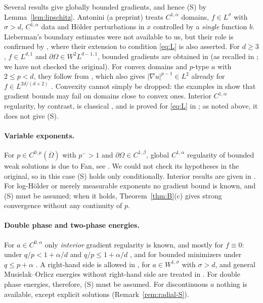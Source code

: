 \documentclass[11pt]{amsart}
\theoremstyle{definition}
\theoremstyle{remark}
\numberwithin{equation}{section}
\newcommand{\abs}[1]{\lvert #1\rvert}
\begin{document}
Several results give globally bounded gradients, and hence (S) by Lemma~\ref{lem:lipschitz}. Antonini \cite[Cor.~1.4]{Antonini2026} (a preprint) treats $C^{1,\alpha}$ domains, $f\in L^\sigma$ with $\sigma>d$, $C^{1,\alpha}$ data and H\"older perturbations in $x$ controlled by a \emph{single} function $b$. Lieberman's boundary estimates \cite[Thms.~1--2]{Lieberman1988} were not available to us, but their role is confirmed by \cite[p.~320]{Lieberman1991}, where their extension to condition \eqref{eq:L} is also asserted. %
For $d\ge3$, $f\in L^{d,1}$ and $\partial\Omega\in W^2L^{d-1,1}$, bounded gradients are obtained in \cite{CianchiMazya2011} (as recalled in \cite[Rem.~2.6]{CianchiMazya2018}; we have not checked the original). For convex domains and $p$-type $a$ with $2\le p<d$, they follow from \cite[Thm.~3.5]{CianchiMazya2014JEMS}, which also gives $\abs{\nabla u}^{p-1}\in L^2$ already for $f\in L^{2d/(d+2)}$ \cite[Thm.~4.1(ii)]{CianchiMazya2014JEMS}. Convexity cannot simply be dropped: the examples in \cite[\S1]{CianchiMazya2014JEMS} show that gradient bounds may fail on domains close to convex ones. Interior $C^{1,\alpha}$ regularity, by contrast, is classical \cite{DiBenedetto1983,Tolksdorf1984}, and is proved for \eqref{eq:L} in \cite[Thm.~1.7]{Lieberman1991}; as noted above, it does not give (S).

\paragraph{Variable exponents.} For $p\in C^{0,\mu}(\overline\Omega)$ with $p^->1$ and $\partial\Omega\in C^{1,\beta}$, global $C^{1,\alpha}$ regularity of bounded weak solutions is due to Fan, see \cite{Fan2007}. %
We could not check its hypotheses in the original, so in this case (S) holds only conditionally. Interior results are given in \cite{CosciaMingione1999,AcerbiMingione2001}. For log-H\"older or merely measurable exponents no gradient bound is known, and (S) must be assumed; when it holds, Theorem~\ref{thm:B}(c) gives strong convergence without any continuity of $p$.

\paragraph{Double phase and two-phase energies.} For $a\in C^{0,\alpha}$ only \emph{interior} gradient regularity is known, and mostly for $f\equiv0$: under $q/p<1+\alpha/d$ \cite[Thm.~1.2]{ColomboMingione2015a} and $q/p\le1+\alpha/d$ \cite[Thm.~1.1]{BaroniColomboMingione2018}, and for bounded minimizers under $q\le p+\alpha$ \cite{ColomboMingione2015b,BaroniColomboMingione2018}. A right-hand side is allowed in \cite[Thm.~1.3]{DeFilippisMingione2021}, for $a\in W^{1,\sigma}$ with $\sigma>d$, and general Musielak--Orlicz energies without right-hand side are treated in \cite{HastoOk2022}. For double phase energies, therefore, (S) must be assumed. For discontinuous $a$ nothing is available, except explicit solutions (Remark~\ref{rem:radial-S}).
\end{document}
